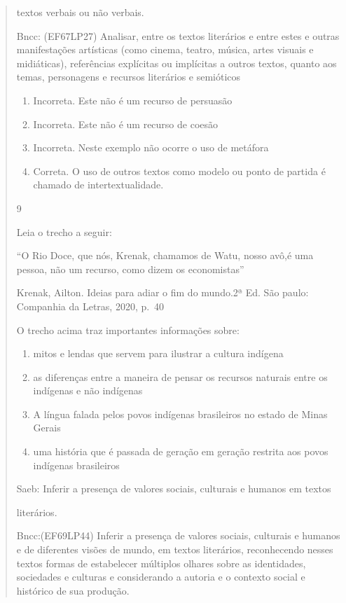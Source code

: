 {\begin{quote}
{\begin{itemize}
\begin{itemize}
textos verbais ou não verbais.

Bncc: (EF67LP27) Analisar, entre os textos literários e entre estes e
outras manifestações artísticas (como cinema, teatro, música, artes
visuais e midiáticas), referências explícitas ou implícitas a outros
textos, quanto aos temas, personagens e recursos literários e semióticos

\begin{enumerate}
\def\labelenumi{\arabic{enumi}.}
\item
  Incorreta. Este não é um recurso de persuasão
\item
  Incorreta. Este não é um recurso de coesão
\item
  Incorreta. Neste exemplo não ocorre o uso de metáfora
\item
  Correta. O uso de outros textos como modelo ou ponto de partida é
  chamado de intertextualidade.
\end{enumerate}

\num{9}

Leia o trecho a seguir:

``O Rio Doce, que nós, Krenak, chamamos de Watu, nosso avô,é uma pessoa,
não um recurso, como dizem os economistas''

Krenak, Ailton. Ideias para adiar o fim do mundo.2ª Ed. São paulo:
Companhia da Letras, 2020, p.~40

O trecho acima traz importantes informações sobre:

\begin{enumerate}

\item
  mitos e lendas que servem para ilustrar a cultura indígena
\item
  as diferenças entre a maneira de pensar os recursos naturais entre os
  indígenas e não indígenas
\item
  A língua falada pelos povos indígenas brasileiros no estado de Minas
  Gerais
\item
  uma história que é passada de geração em geração restrita aos povos
  indígenas brasileiros
\end{enumerate}

Saeb: Inferir a presença de valores sociais, culturais e humanos em
textos

literários.

Bncc:(EF69LP44) Inferir a presença de valores sociais, culturais e
humanos e de diferentes visões de mundo, em textos literários,
reconhecendo nesses textos formas de estabelecer múltiplos olhares sobre
as identidades, sociedades e culturas e considerando a autoria e o
contexto social e histórico de sua produção.


\end{itemize}
\end{itemize}}
\end{quote}}
